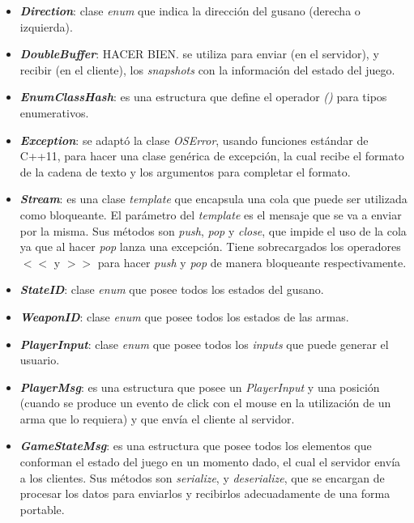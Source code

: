 \begin{itemize}
	\item \textbf{\textit{Direction}}: clase \textit{enum} que indica la dirección del gusano (derecha o izquierda).
	
	\item \textbf{\textit{DoubleBuffer}}: HACER BIEN. se utiliza para enviar (en el servidor), y recibir (en el cliente), los \textit{snapshots} con la información del estado del juego.
	
	\item \textbf{\textit{EnumClassHash}}: es una estructura que define el operador \textit{()} para tipos enumerativos.
	
	\item \textbf{\textit{Exception}}: se adaptó la clase \textit{OSError}, usando funciones estándar de C++11, para hacer una clase genérica de excepción, la cual recibe el formato de la cadena de texto y los argumentos para completar el formato.
	
	\item \textbf{\textit{Stream}}: es una clase \textit{template} que encapsula una cola que puede ser utilizada como bloqueante. El parámetro del \textit{template} es el mensaje que se va a enviar por la misma. Sus métodos son \textit{push}, \textit{pop} y \textit{close}, que impide el uso de la cola ya que al hacer \textit{pop} lanza una excepción. Tiene sobrecargados los operadores $<<$ y $>>$ para hacer \textit{push} y \textit{pop} de manera bloqueante respectivamente.
	
	\item \textbf{\textit{StateID}}: clase \textit{enum} que posee todos los estados del gusano.
	
	\item \textbf{\textit{WeaponID}}: clase \textit{enum} que posee todos los estados de las armas.
	
	\item \textbf{\textit{PlayerInput}}: clase \textit{enum} que posee todos los \textit{inputs} que puede generar el usuario.
	
	\item \textbf{\textit{PlayerMsg}}: es una estructura que posee un \textit{PlayerInput} y una posición (cuando se produce un evento de click con el mouse en la utilización de un arma que lo requiera) y que envía el cliente al servidor.
	
	\item \textbf{\textit{GameStateMsg}}: es una estructura que posee todos los elementos que conforman el estado del juego en un momento dado, el cual el servidor envía a los clientes. Sus métodos son \textit{serialize}, y \textit{deserialize}, que se encargan de procesar los datos para enviarlos y recibirlos adecuadamente de una forma portable.
	

\end{itemize}
